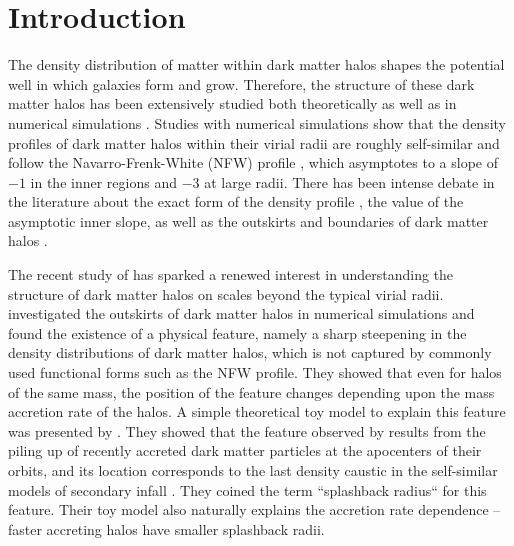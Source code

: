 \documentclass[iop, apjl, twocolappendix, numberedappendix]{emulateapj}
\begin{document}

\section{Introduction}
\label{sec:Introduction}

The density distribution of matter within dark matter halos shapes
the potential well in which galaxies form and grow. Therefore, the
structure of these dark matter halos has been extensively studied
both theoretically as well as in numerical simulations \citep[see
e.g.,][]{gunn1972infall, fillmore1984self, bertschinger1985self,
navarro1997universal, moore1999dark}. Studies with numerical
simulations show that the density profiles of dark matter halos
within their virial radii are roughly self-similar and follow the
Navarro-Frenk-White (NFW) profile \citep{navarro1997universal},
which asymptotes to a slope of $-1$ in the inner regions and $-3$ at
large radii. There has been intense debate in the literature about
the exact form of the density profile 
\citep[e.g.,][]{navarro2004inner}, the value of the asymptotic inner slope,
as well as the outskirts and boundaries of dark matter halos
\citep{cuesta2008virialized, more2011overdensity, diemer2013pseudo}. 

The recent study of \citet{diemer2014dependence} has sparked a
renewed interest in understanding the structure of dark matter halos
on scales beyond the typical virial radii.
\citet{diemer2014dependence} investigated the outskirts of dark
matter halos in numerical simulations and found the existence of a
physical feature, namely a sharp steepening in the density
distributions of dark matter halos, which is not captured by
commonly used functional forms such as the NFW profile. They showed
that even for halos of the same mass, the position of the feature
changes depending upon the mass accretion rate of the halos. A simple
theoretical toy model to explain this feature was presented by
\citet{adhikari2014splashback}. They showed that the feature
observed by \citet{diemer2014dependence} results from the  piling up
of recently accreted dark matter particles at the apocenters of
their orbits, and its location corresponds to the last density
caustic in the self-similar models of secondary infall
\citep{fillmore1984self, bertschinger1985self, lithwick2011self}.
They coined the term ``splashback radius`` for this feature. Their
toy model also naturally explains the accretion rate dependence --
faster accreting halos have smaller splashback radii. 
\end{document}
